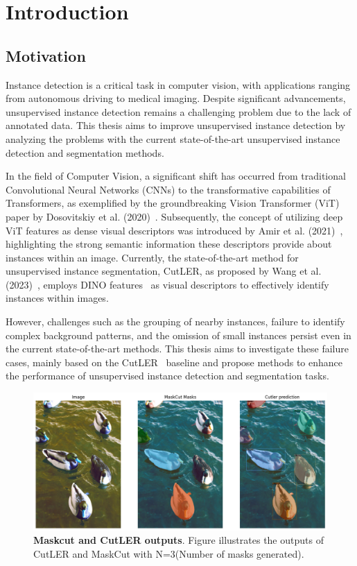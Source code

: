 \chapter{Introduction}\label{chap:introduction}

\section{Motivation}
Instance detection is a critical task in computer vision, with applications ranging from autonomous driving to medical imaging. Despite significant advancements, unsupervised instance detection remains a challenging problem due to the lack of annotated data. This thesis aims to improve unsupervised instance detection by analyzing the problems with the current state-of-the-art unsupervised instance detection and segmentation methods.

In the field of Computer Vision, a significant shift has occurred from traditional Convolutional Neural Networks (CNNs) to the transformative capabilities of Transformers, as exemplified by the groundbreaking Vision Transformer (ViT) paper by Dosovitskiy et al. (2020)~\cite{dosovitskiy2020image}. Subsequently, the concept of utilizing deep ViT features as dense visual descriptors was introduced by Amir et al. (2021)~\cite{amir2021deep}, highlighting the strong semantic information these descriptors provide about instances within an image. Currently, the state-of-the-art method for unsupervised instance segmentation, CutLER, as proposed by Wang et al. (2023)~\cite{wang2023cut}, employs DINO features~\cite{caron2021emerging} as visual descriptors to effectively identify instances within images.

However, challenges such as the grouping of nearby instances, failure to identify complex background patterns, and the omission of small instances persist even in the current state-of-the-art methods. This thesis aims to investigate these failure cases, mainly based on the CutLER~\cite{wang2023cut} baseline and propose methods to enhance the performance of unsupervised instance detection and segmentation tasks.

%
\begin{figure}
	\centering
	\includegraphics[width=1\textwidth]{Images/main/intro_cutler_pic.png}
	\caption[\textbf{Comparison of MaskCut and CutLER outputs}]{\textbf{Maskcut and CutLER outputs}. Figure illustrates the outputs of CutLER and MaskCut with N=3(Number of masks generated).}
	\label{fig:mask_cut_cutler_comparison}
\end{figure}

